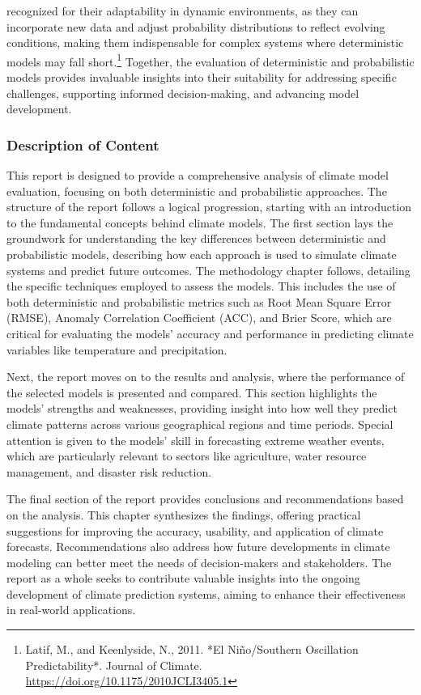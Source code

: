recognized for their adaptability in dynamic environments, as they can incorporate new data and adjust probability distributions to reflect evolving conditions, making them indispensable for complex systems where deterministic models may fall short.\footnote{Latif, M., and Keenlyside, N., 2011. *El Niño/Southern Oscillation Predictability*. Journal of Climate. \url{https://doi.org/10.1175/2010JCLI3405.1}} Together, the evaluation of deterministic and probabilistic models provides invaluable insights into their suitability for addressing specific challenges, supporting informed decision-making, and advancing model development.

\subsubsection{Description of Content}

This report is designed to provide a comprehensive analysis of climate model evaluation, focusing on both deterministic and probabilistic approaches. The structure of the report follows a logical progression, starting with an introduction to the fundamental concepts behind climate models. The first section lays the groundwork for understanding the key differences between deterministic and probabilistic models, describing how each approach is used to simulate climate systems and predict future outcomes. The methodology chapter follows, detailing the specific techniques employed to assess the models. This includes the use of both deterministic and probabilistic metrics such as Root Mean Square Error (RMSE), Anomaly Correlation Coefficient (ACC), and Brier Score, which are critical for evaluating the models' accuracy and performance in predicting climate variables like temperature and precipitation.

Next, the report moves on to the results and analysis, where the performance of the selected models is presented and compared. This section highlights the models' strengths and weaknesses, providing insight into how well they predict climate patterns across various geographical regions and time periods. Special attention is given to the models' skill in forecasting extreme weather events, which are particularly relevant to sectors like agriculture, water resource management, and disaster risk reduction.

The final section of the report provides conclusions and recommendations based on the analysis. This chapter synthesizes the findings, offering practical suggestions for improving the accuracy, usability, and application of climate forecasts. Recommendations also address how future developments in climate modeling can better meet the needs of decision-makers and stakeholders. The report as a whole seeks to contribute valuable insights into the ongoing development of climate prediction systems, aiming to enhance their effectiveness in real-world applications.






